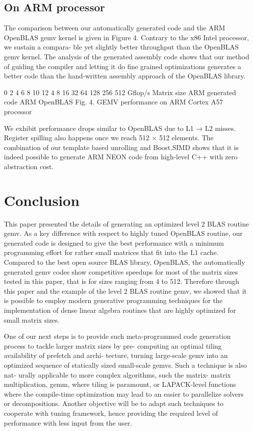 \documentclass[../../main.tex]{subfiles}
\begin{document}
\subsection{On ARM processor}

The comparison between our automatically generated code
and the ARM OpenBLAS gemv kernel is given in Figure 4.
Contrary to the x86 Intel processor, we sustain a compara-
ble yet slightly better throughput than the OpenBLAS gemv
kernel. The analysis of the generated assembly code shows
that our method of guiding the compiler and letting it do
fine grained optimizations generates a better code than the
hand-written assembly approach of the OpenBLAS library.

0
2
4
6
8
10
12
4 8 16 32 64 128 256 512
Gflop/s
Matrix size
ARM generated code
ARM OpenBLAS
Fig. 4. GEMV performance on ARM Cortex A57 processor

We exhibit performance drops similar to OpenBLAS due to
L1 → L2 misses. Register spilling also happens once we reach
512 × 512 elements. The combination of our template based
unrolling and Boost.SIMD shows that it is indeed possible to
generate ARM NEON code from high-level C++ with zero
abstraction cost.

\section{Conclusion}

This paper presented the details of generating an optimized
level 2 BLAS routine gemv. As a key difference with respect
to highly tuned OpenBLAS routine, our generated code
is designed to give the best performance with a minimum
programming effort for rather small matrices that fit into the
L1 cache. Compared to the best open source BLAS library,
OpenBLAS, the automatically generated gemv codes show
competitive speedups for most of the matrix sizes tested in
this paper, that is for sizes ranging from 4 to 512. Therefore
through this paper and the example of the level 2 BLAS
routine gemv, we showed that it is possible to employ modern
generative programming techniques for the implementation
of dense linear algebra routines that are highly optimized for
small matrix sizes.

One of our next steps is to provide such meta-programmed
code generation process to tackle larger matrix sizes by pre-
computing an optimal tiling availability of prefetch and archi-
tecture, turning large-scale gemv into an optimized sequence of
statically sized small-scale gemvs. Such a technique is also nat-
urally applicable to more complex algorithms, such the matrix-
matrix multiplication, gemm, where tiling is paramount, or
LAPACK-level functions where the compile-time optimization
may lead to an easier to parallelize solvers or decompositions.
Another objective will be to adapt such techniques to cooperate
with tuning framework, hence providing the required level of
performance with less input from the user.
\end{document}

